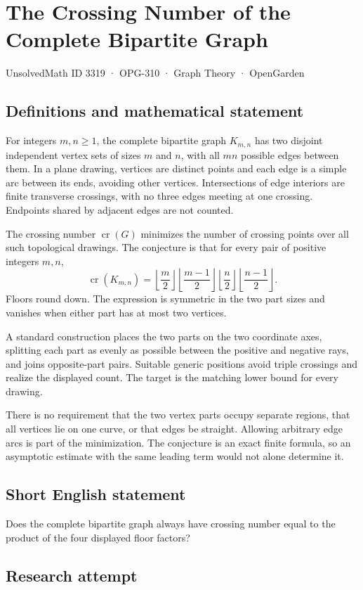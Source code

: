 \documentclass[11pt,a4paper]{article}
\begin{document}
\section*{The Crossing Number of the Complete Bipartite Graph}\label{3319}
{\small UnsolvedMath ID 3319 · OPG-310 · Graph Theory · OpenGarden}
\subsection{Definitions and mathematical statement}
For integers $m,n\ge1$, the complete bipartite graph $K_{m,n}$ has
two disjoint independent vertex sets of sizes $m$ and $n$, with all
$mn$ possible edges between them. In a plane drawing, vertices are
distinct points and each edge is a simple arc between its ends,
avoiding other vertices. Intersections of edge interiors are finite
transverse crossings, with no three edges meeting at one crossing.
Endpoints shared by adjacent edges are not counted.

The crossing number $\operatorname{cr}(G)$ minimizes the number of
crossing points over all such topological drawings. The conjecture
is that for every pair of positive integers $m,n$,
\[
 \operatorname{cr}(K_{m,n})=
       \left\lfloor\frac m2\right\rfloor
       \left\lfloor\frac{m-1}2\right\rfloor
       \left\lfloor\frac n2\right\rfloor
       \left\lfloor\frac{n-1}2\right\rfloor.
\]
Floors round down. The expression is symmetric in the two part sizes
and vanishes when either part has at most two vertices.

A standard construction places the two parts on the two coordinate
axes, splitting each part as evenly as possible between the positive
and negative rays, and joins opposite-part pairs. Suitable generic
positions avoid triple crossings and realize the displayed count.
The target is the matching lower bound for every drawing.

There is no requirement that the two vertex parts occupy separate
regions, that all vertices lie on one curve, or that edges be
straight. Allowing arbitrary edge arcs is part of the minimization.
The conjecture is an exact finite formula, so an asymptotic estimate
with the same leading term would not alone determine it.
\subsection{Short English statement}
Does the complete bipartite graph always have crossing number equal to the product of the four displayed floor factors?
\subsection{Research attempt}
\end{document}
